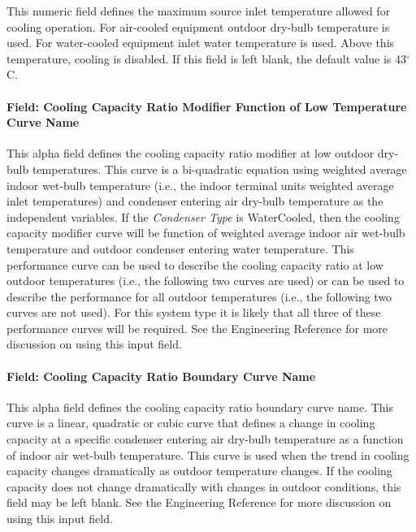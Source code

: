 This numeric field defines the maximum source inlet temperature allowed for cooling operation. For air-cooled equipment outdoor dry-bulb temperature is used. For water-cooled equipment inlet water temperature is used. Above this temperature, cooling is disabled. If this field is left blank, the default value is 43$^\circ$C.

\paragraph{Field: Cooling Capacity Ratio Modifier Function of Low Temperature Curve Name}\label{field-cooling-capacity-ratio-modifier-function-of-low-temperature-curve-name}

This alpha field defines the cooling capacity ratio modifier at low outdoor dry-bulb temperatures. This curve is a bi-quadratic equation using weighted average indoor wet-bulb temperature (i.e., the indoor terminal units weighted average inlet temperatures) and condenser entering air dry-bulb temperature as the independent variables. If the \textit{Condenser Type} is WaterCooled, then the cooling capacity modifier curve will be function of weighted average indoor air wet-bulb temperature and outdoor condenser entering water temperature. This performance curve can be used to describe the cooling capacity ratio at low outdoor temperatures (i.e., the following two curves are used) or can be used to describe the performance for all outdoor temperatures (i.e., the following two curves are not used). For this system type it is likely that all three of these performance curves will be required. See the Engineering Reference for more discussion on using this input field.

\paragraph{Field: Cooling Capacity Ratio Boundary Curve Name}\label{field-cooling-capacity-ratio-boundary-curve-name}

This alpha field defines the cooling capacity ratio boundary curve name. This curve is a linear, quadratic or cubic curve that defines a change in cooling capacity at a specific condenser entering air dry-bulb temperature as a function of indoor air wet-bulb temperature. This curve is used when the trend in cooling capacity changes dramatically as outdoor temperature changes. If the cooling capacity does not change dramatically with changes in outdoor conditions, this field may be left blank. See the Engineering Reference for more discussion on using this input field.

